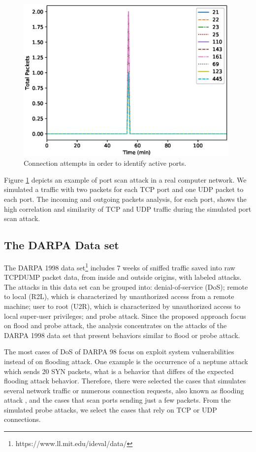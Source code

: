 \begin{figure}[h!]
     \centering 
     \includegraphics[width=11cm]{figures/ch2/portscam_traffic.eps}
     \caption{Connection attempts in order to identify active ports.}
     \label{fig:2.07}
\end{figure}

Figure \ref{fig:2.07} depicts an example of port scan attack in a real computer network. We simulated a traffic with two packets for each TCP port and one UDP packet to each port. The incoming and outgoing packets analysis, for each port, shows the high correlation and similarity of TCP and UDP traffic during the simulated port scan attack.

\subsection{The DARPA Data set}
\label{sec:2_Darpadata set}

The DARPA 1998 data set\footnote{https://www.ll.mit.edu/ideval/data/} includes 7 weeks of sniffed traffic saved into raw TCPDUMP packet data, from inside and outside origins, with labeled attacks. The attacks in this data set can be grouped into: denial-of-service (DoS); remote to local (R2L), which is characterized by unauthorized access from a remote machine; user to root (U2R), which is characterized by unauthorized access to local super-user privileges; and probe attack. Since the proposed approach focus on flood and probe attack, the analysis concentrates on the attacks of the DARPA 1998 data set that present behaviors similar to flood or probe attack. 

The most cases of DoS of DARPA 98 focus on exploit system vulnerabilities instead of on flooding attack. One example is the occurrence of a neptune attack which sends 20 SYN packets, what is a behavior that differs of the expected flooding attack behavior. Therefore, there were selected the cases that simulates several network traffic or numerous connection requests, also known as flooding attack \cite{ahmed2016survey, osanaiye2016distributed}, and the cases that scan ports sending just a few packets. From the simulated probe attacks, we select the cases that rely on TCP or UDP connections.

